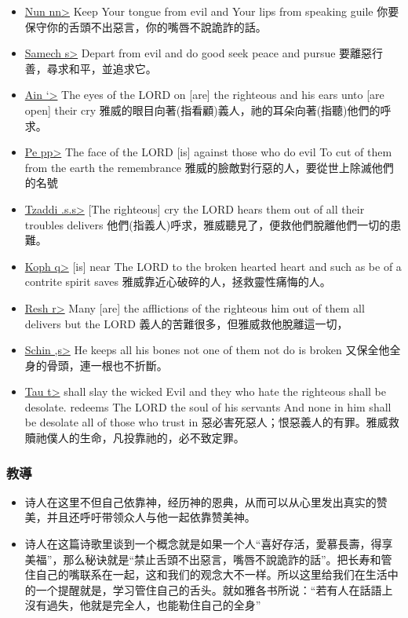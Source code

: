 \begin{itemize}
\item \underline{Nun \<nn>} Keep Your tongue from evil and Your lips from speaking guile 你要保守你的舌頭不出惡言，你的嘴唇不說詭詐的話。 
\item \underline{Samech \<s>} Depart from evil and do good seek peace and pursue 要離惡行善，尋求和平，並追求它。 
\item \underline{Ain \<`>} The eyes of the LORD on [are] the righteous and his ears unto [are open] their cry 雅威的眼目向著(指看顧)義人，祂的耳朵向著(指聽)他們的呼求。 
\item \underline{Pe \<pp>} The face of the LORD [is] against those who do evil To cut of them from the earth the remembrance 雅威的臉敵對行惡的人，要從世上除滅他們的名號 
\item \underline{Tzaddi \<.s.s>} [The righteous] cry the LORD hears them out of all their troubles delivers 他們(指義人)呼求，雅威聽見了，便救他們脫離他們一切的患難。
\item \underline{Koph \<q>} [is] near The LORD to the broken hearted heart and such as be of a contrite spirit saves 雅威靠近心破碎的人，拯救靈性痛悔的人。 
\item \underline{Resh  \<r>} Many [are] the afflictions of the righteous him out of them all delivers but the LORD 義人的苦難很多，但雅威救他脫離這一切， 
\item \underline{Schin \<,s>} He keeps all his bones not one of them not do is broken 又保全他全身的骨頭，連一根也不折斷。 
\item \underline{Tau \<t>} shall slay the wicked Evil and they who hate the righteous shall be desolate. redeems The LORD the soul of his servants And none in him shall be desolate all of those who trust in 惡必害死惡人；恨惡義人的有罪。雅威救贖祂僕人的生命，凡投靠祂的，必不致定罪。 
\end{itemize}

\subsubsection{教導}
\begin{itemize}
\itemsep-.45em 
\item 诗人在这里不但自己依靠神，经历神的恩典，从而可以从心里发出真实的赞美，并且还呼吁带领众人与他一起依靠赞美神。
\item 诗人在这篇诗歌里谈到一个概念就是如果一个人“喜好存活，愛慕長壽，得享美福”，那么秘诀就是“禁止舌頭不出惡言，嘴唇不說詭詐的話”。把长寿和管住自己的嘴联系在一起，这和我们的观念大不一样。所以这里给我们在生活中的一个提醒就是，学习管住自己的舌头。就如雅各书所说：“若有人在話語上沒有過失，他就是完全人，也能勒住自己的全身”
\end{itemize}

